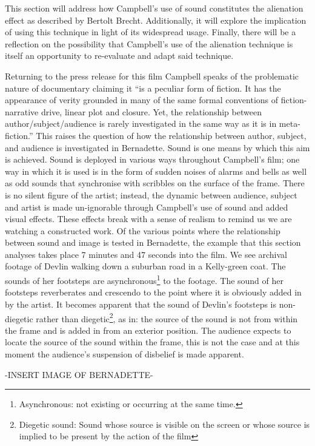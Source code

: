 \documentclass[12pt]{article}
\begin{document}
This section will address how Campbell's use of sound constitutes the alienation effect as described by Bertolt Brecht. Additionally, it will explore the implication of using this technique in light of its widespread usage. Finally, there will be a reflection on the possibility that Campbell's use of the alienation technique is itself an opportunity to re-evaluate and adapt said technique. 

Returning to the press release for this film Campbell speaks of the problematic nature of documentary claiming it ``is a peculiar form of fiction. It has the appearance of verity grounded in many of the same formal conventions of fiction-narrative drive, linear plot and closure. Yet, the relationship between author/subject/audience is rarely investigated in the same way as it is in meta-fiction.''\citeyear{Campbell:2008aa} This raises the question of how the relationship between author, subject, and audience is investigated in Bernadette. Sound is one means by which this aim is achieved. Sound is deployed in various ways throughout Campbell's film; one way in which it is used is in the form of sudden noises of alarms and bells as well as odd sounds that synchronise with scribbles on the surface of the frame. There is no silent figure of the artist; instead, the dynamic between audience, subject and artist is made un-ignorable through Campbell's use of sound and added visual effects. These effects break with a sense of realism to remind us we are watching a constructed work. Of the various points where the relationship between sound and image is tested in Bernadette, the example that this section analyses takes place 7 minutes and 47 seconds into the film. We see archival footage of Devlin walking down a suburban road in a Kelly-green coat. The sounds of her footsteps are asynchronous\footnote{Asynchronous: not existing or occurring at the same time.} to the footage. The sound of her footsteps reverberates and crescendo to the point where it is obviously added in by the artist. It becomes apparent that the sound of Devlin's footsteps is non-diegetic rather than diegetic\footnote{Diegetic sound:
Sound whose source is visible on the screen or whose source is implied to be present by the action of the film}, as in: the source of the sound is not from within the frame and is added in from an exterior position. The audience expects to locate the source of the sound within the frame, this is not the case and at this moment the audience's suspension of disbelief is made apparent. 

-INSERT IMAGE OF BERNADETTE-
\end{document}
